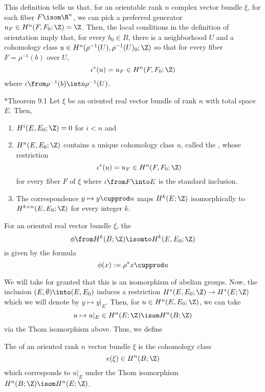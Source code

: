 \documentclass[11pt,leqno,oneside]{amsbook}
\numberwithin{thm}{section}
\begin{document}
This definition tells us that, for an orientable rank \(n\) complex
vector bundle \(\xi\), for each fiber \(F \isom \R^n\), we can pick a
preferred generator \(u_F \in H^n(F,F_0;\Z) = \Z\). Then, the local
conditions in the definition of orientation imply that, for every
\(b_0 \in B\), there is a neighborhood \(U\) and a cohomology class
\(u \in H^n(\rho^{-1}(U), \rho^{-1}(U)_0;\Z)\) so that for every fiber
\(F = \rho^{-1}(b)\) over \(U\), \[
  \iota^*(u) = u_F \in H^n(F,F_0;\Z)
\]
where \(\iota \from \rho^{-1}(b) \into \rho^{-1}(U)\).
\begin{thm}
  \cite{milnor-stasheff}*{Theorem 9.1} Let \(\xi\) be an oriented
  real vector bundle of rank \(n\) with total space \(E\). Then,
  \begin{enumerate}
  \item \(H^i(E,E_0;\Z) = 0\) for \(i < n\) and
  \item \(H^n(E,E_0;\Z)\) contains a unique cohomology class \(u\),
    called the , 
    whose restriction \[
      \iota^*(u) = u_F \in H^n(F,F_0;\Z)
    \]
    for every fiber \(F\) of \(\xi\) where \(\iota \from F \into E\)
    is the standard inclusion.
  \item The correspondence \(y \mapsto y \cupprod u\) maps
    \(H^k(E;\Z)\) isomorphically to \(H^{k+n}(E,E_0;\Z)\) for every
    integer \(k\).
  \end{enumerate}
\end{thm}
\begin{defn}
  For an oriented real vector bundle \(\xi\), the  \[ 
    \phi \from H^k(B;\Z) \isomto H^k(E,E_0;\Z)
  \]
  is given by the formula \[
    \phi(x) := \rho^* x \cupprod u
  \]
\end{defn}
We will take for granted that this is an isomorphism of abelian
groups. Now, the inclusion \((E, \emptyset) \into (E, E_0)\) induces a
restriction \(H^*(E,E_0;\Z) \to H^*(E;\Z)\) which we will denote by
\(y \mapsto y|_E\). Then, for \(u \in H^n(E,E_0;\Z)\), we can take \[
  u \mapsto u|_E \in H^n(E;\Z) \isom H^n(B;\Z)
\]
via the Thom isomorphism above. Thus, we define
\begin{defn}
  The  of an oriented rank \(n\) vector bundle \(\xi\)
  is the cohomology class \[
    e(\xi) \in H^n(B;\Z)
  \]
  which corresponds to \(u|_E\) under the Thom isomorphism
  \(H^n(B;\Z) \isom H^n(E;\Z)\).
\end{defn}
\end{document}
